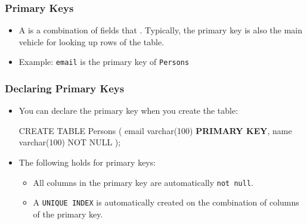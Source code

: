 \documentclass[dvipsnames,handout]{beamer}
\begin{document}
\begin{frame}
\frametitle{Primary Keys}

\begin{itemize}  
\item A  is a combination of fields that . Typically, the primary key is also the
  main vehicle for looking up rows of the table.

\item Example: \texttt{email} is the primary key of \texttt{Persons}
\end{itemize}
\end{frame}




\begin{frame}[fragile=singleslide]
  \frametitle{Declaring Primary Keys}
  \begin{itemize}
  \item You can declare the primary key when you create the table:
\begin{footnotesize}
\begin{semiverbatim}
  CREATE TABLE Persons (
     email  varchar(100) \textbf{PRIMARY KEY},
     name   varchar(100) NOT NULL
  );
\end{semiverbatim}
\end{footnotesize}

\item The following holds for primary keys:
\begin{itemize}
\item All columns in the primary key are automatically \texttt{not null}.
\item A \texttt{UNIQUE INDEX} is automatically created on the
  combination of columns of the primary key.
\end{itemize}

  \end{itemize}
\end{frame}





\end{document}
